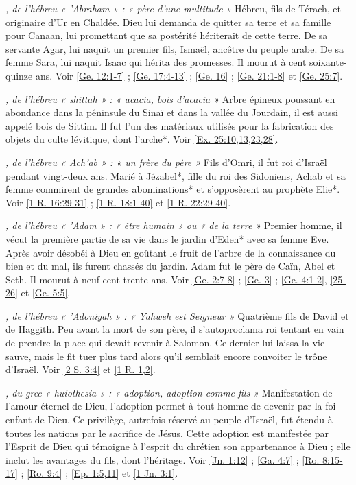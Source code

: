 \begin{multicols}{2}
\textit{, de l'hébreu « 'Abraham » : « père d'une multitude »}\newline
Hébreu, fils de Térach, et originaire d'Ur en Chaldée. Dieu lui demanda de quitter sa terre et sa famille pour Canaan, lui promettant que sa postérité hériterait de cette terre. De sa servante Agar, lui naquit un premier fils, Ismaël, ancêtre du peuple arabe. De sa femme Sara, lui naquit Isaac qui hérita des promesses. Il mourut à cent soixante-quinze ans. Voir \vref{Ge. 12:1-7} ; \vref{Ge. 17:4-13} ; \vref{Ge. 16} ; \vref{Ge. 21:1-8} et \vref{Ge. 25:7}.

\textit{, de l'hébreu « shittah » : « acacia, bois d'acacia »}\newline
Arbre épineux poussant en abondance dans la péninsule du Sinaï et dans la vallée du Jourdain, il est aussi appelé bois de Sittim. Il fut l'un des matériaux utilisés pour la fabrication des objets du culte lévitique, dont l'arche*. Voir \vref{Ex. 25:10,13,23,28}.

\textit{, de l'hébreu « Ach'ab » : « un frère du père »}\newline
Fils d'Omri, il fut roi d'Israël pendant vingt-deux ans. Marié à Jézabel*, fille du roi des Sidoniens, Achab et sa femme commirent de grandes abominations* et s'opposèrent au prophète Elie*. Voir \vref{1 R. 16:29-31} ; \vref{1 R. 18:1-40} et \vref{1 R. 22:29-40}.

\textit{, de l'hébreu « 'Adam » : « être humain » ou « de la terre »}\newline
Premier homme, il vécut la première partie de sa vie dans le jardin d'Eden* avec sa femme Eve. Après avoir désobéi à Dieu en goûtant le fruit de l'arbre de la connaissance du bien et du mal, ils furent chassés du jardin. Adam fut le père de Caïn, Abel et Seth. Il mourut à neuf cent trente ans. Voir \vref{Ge. 2:7-8} ; \vref{Ge. 3} ; \vref{Ge. 4:1-2}, \vref{25-26} et \vref{Ge. 5:5}.

\textit{, de l'hébreu « 'Adoniyah » : « Yahweh est Seigneur »}\newline
Quatrième fils de David et de Haggith. Peu avant la mort de son père, il s'autoproclama roi tentant en vain de prendre la place qui devait revenir à Salomon. Ce dernier lui laissa la vie sauve, mais le fit tuer plus tard alors qu'il semblait encore convoiter le trône d'Israël. Voir \vref{2 S. 3:4} et \vref{1 R. 1,2}.

\textit{, du grec « huiothesia » : « adoption, adoption comme fils »}\newline
Manifestation de l'amour éternel de Dieu, l'adoption permet à tout homme de devenir par la foi enfant de Dieu. Ce privilège, autrefois réservé au peuple d'Israël, fut étendu à toutes les nations par le sacrifice de Jésus. Cette adoption est manifestée par l'Esprit de Dieu qui témoigne à l'esprit du chrétien son appartenance à Dieu ; elle inclut les avantages du fils, dont l'héritage. Voir \vref{Jn. 1:12} ; \vref{Ga. 4:7} ; \vref{Ro. 8:15-17} ; \vref{Ro. 9:4} ; \vref{Ep. 1:5,11} et \vref{1 Jn. 3:1}.


\end{multicols}

